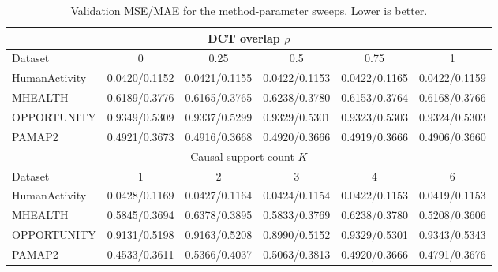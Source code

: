 \begin{table}[H]
\centering
\setlength{\tabcolsep}{5pt}
\caption{Validation MSE/MAE for the method-parameter sweeps. Lower is better.}
\label{tab:v675-method-sensitivity}
\begin{tabular}{@{}lccccc@{}}
\toprule
\multicolumn{6}{c}{DCT overlap $\rho$} \\
\midrule
Dataset & 0 & 0.25 & 0.5 & 0.75 & 1 \\
\midrule
HumanActivity & 0.0420/0.1152 & 0.0421/0.1155 & 0.0422/0.1153 & 0.0422/0.1165 & 0.0422/0.1159 \\
MHEALTH & 0.6189/0.3776 & 0.6165/0.3765 & 0.6238/0.3780 & 0.6153/0.3764 & 0.6168/0.3766 \\
OPPORTUNITY & 0.9349/0.5309 & 0.9337/0.5299 & 0.9329/0.5301 & 0.9323/0.5303 & 0.9324/0.5303 \\
PAMAP2 & 0.4921/0.3673 & 0.4916/0.3668 & 0.4920/0.3666 & 0.4919/0.3666 & 0.4906/0.3660 \\
\midrule
\multicolumn{6}{c}{Causal support count $K$} \\
\midrule
Dataset & 1 & 2 & 3 & 4 & 6 \\
\midrule
HumanActivity & 0.0428/0.1169 & 0.0427/0.1164 & 0.0424/0.1154 & 0.0422/0.1153 & 0.0419/0.1153 \\
MHEALTH & 0.5845/0.3694 & 0.6378/0.3895 & 0.5833/0.3769 & 0.6238/0.3780 & 0.5208/0.3606 \\
OPPORTUNITY & 0.9131/0.5198 & 0.9163/0.5208 & 0.8990/0.5152 & 0.9329/0.5301 & 0.9343/0.5343 \\
PAMAP2 & 0.4533/0.3611 & 0.5366/0.4037 & 0.5063/0.3813 & 0.4920/0.3666 & 0.4791/0.3676 \\
\bottomrule
\end{tabular}
\end{table}
